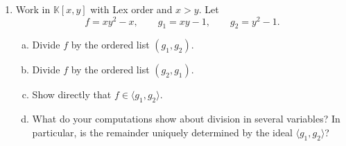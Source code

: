 \documentclass[12pt]{amsart}
\theoremstyle{definition}
\newcommand{\KK}{\mathbb{K}}
\begin{document}
\begin{enumerate}
\ \\

\item Work in $\KK[x,y]$ with Lex order and $x>y$. Let
\[
f=xy^2-x,\qquad g_1=xy-1,\qquad g_2=y^2-1.
\]
\begin{enumerate}[(a)]
    \item Divide $f$ by the ordered list $(g_1,g_2)$.
    
    \item Divide $f$ by the ordered list $(g_2,g_1)$.
    
    \item Show directly that $f\in \langle g_1,g_2\rangle$.
    
    \item What do your computations show about division in several variables? In particular, is the remainder uniquely determined by the ideal $\langle g_1,g_2\rangle$?
\end{enumerate}

\end{enumerate}
\end{document}
